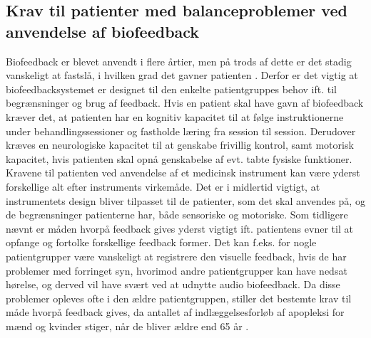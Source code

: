 \subsection{Krav til patienter med balanceproblemer ved anvendelse af biofeedback}
Biofeedback er blevet anvendt i flere årtier, men på trods af dette er det stadig vanskeligt at fastslå, i hvilken grad det gavner patienten \cite{Glanz1997}. Derfor er det vigtig at biofeedbacksystemet er designet til den enkelte patientgruppes behov ift. til  begrænsninger og brug af feedback. Hvis en patient skal have gavn af biofeedback kræver det, at patienten har en kognitiv kapacitet til at følge instruktionerne under behandlingssessioner og fastholde læring fra session til session. Derudover kræves en neurologiske kapacitet til at genskabe frivillig kontrol, samt motorisk kapacitet, hvis patienten skal opnå genskabelse af evt. tabte fysiske funktioner. \cite{Middaugh1989} Kravene til patienten ved anvendelse af et medicinsk instrument kan være yderst forskellige alt efter instruments virkemåde. Det er i midlertid vigtigt, at instrumentets design bliver tilpasset til de patienter, som det skal anvendes på, og de begrænsninger patienterne har, både sensoriske og motoriske. Som tidligere nævnt er måden hvorpå feedback gives yderst vigtigt ift. patientens evner til at opfange og fortolke forskellige feedback former. Det kan f.eks. for nogle patientgrupper være vanskeligt at registrere den visuelle feedback, hvis de har problemer med forringet syn, hvorimod andre patientgrupper kan have nedsat hørelse, og derved vil have svært ved at udnytte audio biofeedback.  Da disse problemer opleves ofte i den ældre patientgruppen, stiller det bestemte krav til måde hvorpå feedback gives, da antallet af indlæggelsesforløb af apopleksi for mænd og kvinder stiger, når de bliver ældre end 65 år \cite{Sundhedsstyrelsen2011}.  \\









